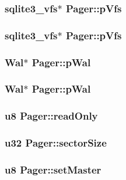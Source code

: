 \subsubsection{\setlength{\rightskip}{0pt plus 5cm}\bf{sqlite3\_\-vfs}$\ast$ \bf{Pager::p\-Vfs}}\label{structPager_eff7ecfcd9956f4c5022610092e5b8a4}


\subsubsection{\setlength{\rightskip}{0pt plus 5cm}\bf{sqlite3\_\-vfs}$\ast$ \bf{Pager::p\-Vfs}}\label{structPager_eff7ecfcd9956f4c5022610092e5b8a4}


\subsubsection{\setlength{\rightskip}{0pt plus 5cm}\bf{Wal}$\ast$ \bf{Pager::p\-Wal}}\label{structPager_8c7b00572353e763b7e9251a11a32df6}


\subsubsection{\setlength{\rightskip}{0pt plus 5cm}\bf{Wal}$\ast$ \bf{Pager::p\-Wal}}\label{structPager_8c7b00572353e763b7e9251a11a32df6}


\subsubsection{\setlength{\rightskip}{0pt plus 5cm}\bf{u8} \bf{Pager::read\-Only}}\label{structPager_780c09d4959e6300bfe051b9b58ae130}


\subsubsection{\setlength{\rightskip}{0pt plus 5cm}\bf{u32} \bf{Pager::sector\-Size}}\label{structPager_f8516d5d7e134a9d8e5456b69c4a526e}


\subsubsection{\setlength{\rightskip}{0pt plus 5cm}\bf{u8} \bf{Pager::set\-Master}}\label{structPager_0d90bd357615be24bdc9e9e6f5a07a5e}


